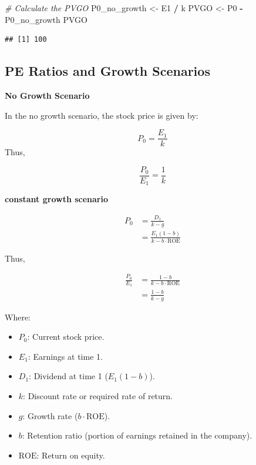 \documentclass[
]{book}
\newenvironment{Shaded}{\begin{snugshade}}{\end{snugshade}}
\newcommand{\CommentTok}[1]{\textcolor[rgb]{0.56,0.35,0.01}{\textit{#1}}}
\newcommand{\NormalTok}[1]{#1}
\newcommand{\OtherTok}[1]{\textcolor[rgb]{0.56,0.35,0.01}{#1}}
\newcommand{\SpecialCharTok}[1]{\textcolor[rgb]{0.81,0.36,0.00}{\textbf{#1}}}
\providecommand{\tightlist}{%
  \setlength{\itemsep}{0pt}\setlength{\parskip}{0pt}}
\begin{document}
\begin{Shaded}
\begin{Highlighting}[]
\CommentTok{\# Calculate the PVGO}
\NormalTok{P0\_no\_growth }\OtherTok{\textless{}{-}}\NormalTok{ E1 }\SpecialCharTok{/}\NormalTok{ k}
\NormalTok{PVGO }\OtherTok{\textless{}{-}}\NormalTok{ P0 }\SpecialCharTok{{-}}\NormalTok{ P0\_no\_growth}
\NormalTok{PVGO}
\end{Highlighting}
\end{Shaded}

\begin{verbatim}
## [1] 100
\end{verbatim}

\hypertarget{pe-ratios-and-growth-scenarios}{%
\subsection{PE Ratios and Growth Scenarios}\label{pe-ratios-and-growth-scenarios}}

\textbf{No Growth Scenario}

In the no growth scenario, the stock price is given by:

\[
P_0 = \frac{E_1}{k} 
\]
Thus,

\[
\frac{P_0}{E_1} = \frac{1}{k}
\]

\textbf{constant growth scenario}

\[
\begin{aligned}
P_0 &= \frac{D_1}{k - g} \\
    &= \frac{E_1 (1 - b)}{k - b \cdot \text{ROE}}
\end{aligned}
\]

Thus,

\[
\begin{aligned}
\frac{P_0}{E_1} &= \frac{1 - b}{k - b \cdot \text{ROE}} \\
                &= \frac{1 - b}{k - g}
\end{aligned}
\]

Where:

\begin{itemize}
\tightlist
\item
  \(P_0\): Current stock price.
\item
  \(E_1\): Earnings at time 1.
\item
  \(D_1\): Dividend at time 1 (\(E_1 (1 - b)\)).
\item
  \(k\): Discount rate or required rate of return.
\item
  \(g\): Growth rate (\(b \cdot \text{ROE}\)).
\item
  \(b\): Retention ratio (portion of earnings retained in the company).
\item
  \(\text{ROE}\): Return on equity.
\end{itemize}
\end{document}
